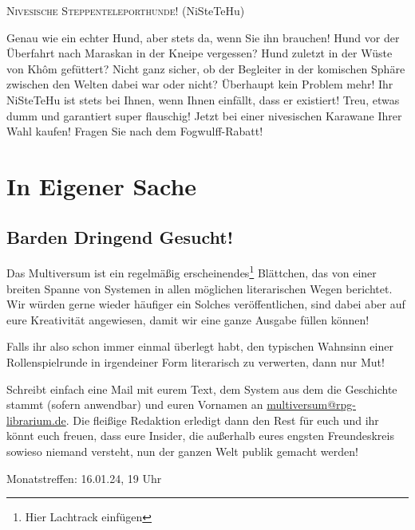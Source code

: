 \documentclass[final]{multiversum}
\begin{document}
\begin{center}\textsc{Nivesische Steppenteleporthunde!} {\footnotesize(NiSteTeHu)}\end{center}

Genau wie ein echter Hund, aber stets da, wenn Sie ihn brauchen!
Hund vor der Überfahrt nach Maraskan in der Kneipe vergessen?  Hund zuletzt in
der Wüste von Khôm gefüttert?  Nicht ganz sicher, ob der Begleiter in der
komischen Sphäre zwischen den Welten dabei war oder nicht? Überhaupt kein
Problem mehr!  Ihr NiSteTeHu ist stets bei Ihnen, wenn Ihnen einfällt, dass er
existiert!  Treu, etwas dumm und garantiert super flauschig!  Jetzt bei einer
nivesischen Karawane Ihrer Wahl kaufen! Fragen Sie nach dem Fogwulff-Rabatt!


\section{In Eigener Sache}
\subsection{Barden Dringend Gesucht!}
Das Multiversum ist ein regelmäßig erscheinendes\footnote{Hier Lachtrack
einfügen} Blättchen, das von einer breiten Spanne von Systemen in allen
möglichen literarischen Wegen berichtet. Wir würden gerne wieder häufiger
ein Solches veröffentlichen, sind dabei aber auf eure Kreativität angewiesen,
damit wir eine ganze Ausgabe füllen können!

Falls ihr also schon immer einmal überlegt habt, den typischen Wahnsinn einer
Rollenspielrunde in irgendeiner Form literarisch zu verwerten, dann nur Mut!

Schreibt einfach eine Mail mit eurem Text, dem System aus dem die Geschichte
stammt (sofern anwendbar) und euren Vornamen an
\url{multiversum@rpg-librarium.de}. Die fleißige Redaktion erledigt dann den
Rest für euch und ihr könnt euch freuen, dass eure Insider, die außerhalb eures
engsten Freundeskreis sowieso niemand versteht, nun der ganzen Welt publik
gemacht werden!



\begin{termine}
\item Monatstreffen: 16.01.24, 19 Uhr
\end{termine}
\impressum
\end{document}
